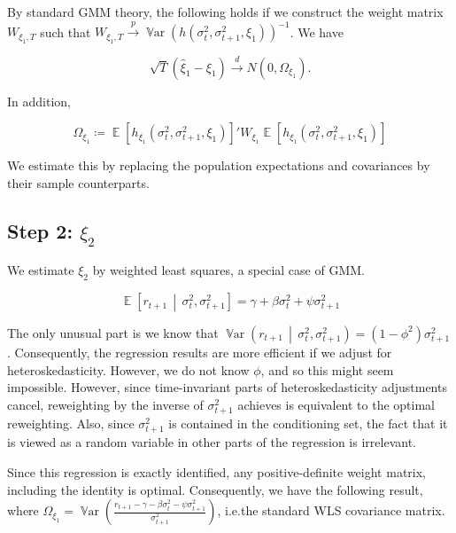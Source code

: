 \documentclass[11pt, letterpaper, twoside, final]{article}
\newcommand*{\dto}{\overset{d}{\longrightarrow}}
\newcommand*{\pto}{\overset{p}{\longrightarrow}}
\newcommand*{\mvert}{\,\middle\vert\,}
\DeclareMathOperator*{\Var}{\mathbb{V}ar}
\DeclareMathOperator*{\E}{\mathbb{E}}
\begin{document}
By standard GMM theory, the following holds if we construct the weight matrix $W_{\xi_1,T}$ such that
$W_{{\xi}_1,T} \pto \Var(h(\sigma^2_{t},\sigma^2_{t+1}, \xi_1))^{-1}$.
We have 

\begin{equation}
    \sqrt{T}(\hat{\xi}_1 - \xi_1) \dto N\left(0, \Omega_{\xi_1}\right).
\end{equation}

In addition, 

\begin{equation}
    \Omega_{\xi_1} \coloneqq \E\left[h_{\xi_1}(\sigma^2_{t}, \sigma^2_{t+1}, \xi_{1})\right]' W_{\xi_1}
    \E\left[h_{\xi_1}(\sigma^2_{t}, \sigma^2_{t+1}, \xi_{1})\right] 
\end{equation}

We estimate this by replacing the population expectations and covariances by their sample counterparts.

\subsection{Step 2: $\xi_2$}\label{sec:est_xi2}

We estimate $\xi_2$ by weighted least squares, a special case of GMM. 

\begin{equation}
    \E\left[r_{t+1} \mvert \sigma^2_t, \sigma^2_{t+1}\right]  = \gamma + \beta \sigma^2_t + \psi \sigma^2_{t+1}
\end{equation}

The only unusual part is we know that $\Var\left(r_{t+1} \mvert \sigma^2_t, \sigma^2_{t+1}\right) = (1-\phi^2)
\sigma^2_{t+1}$.
Consequently, the regression results  are more efficient if we adjust for heteroskedasticity.
However, we do not know $\phi$, and so this might seem impossible.
However, since time-invariant parts of heteroskedasticity adjustments cancel, reweighting by the inverse of
$\sigma^2_{t+1}$ achieves is equivalent to the optimal reweighting. 
Also, since $\sigma^2_{t+1}$ is contained in the conditioning set, the fact that it is viewed as a random variable
in other parts  of the regression is irrelevant.

Since this regression is exactly identified, any positive-definite weight matrix, including the identity is
optimal.
Consequently, we have the following result, where $\Omega_{\xi_1} = \Var(\frac{r_{t+1} - \gamma - \beta
\sigma^2_{t} - \psi \sigma^2_{t+1}}{\sigma^2_{t+1}})$, i.e.\@ the standard WLS covariance matrix.
\end{document}
